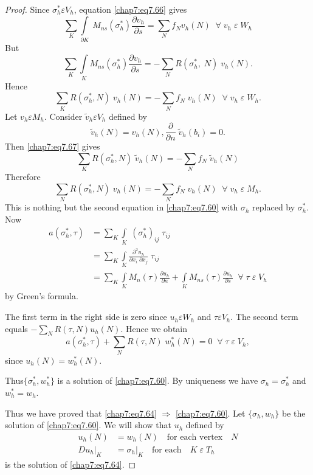 \begin{proof}
Since $\sigma_h^* \varepsilon V_h$, equation \eqref{chap7:eq7.66}
gives 
$$
\sum\limits_K\int\limits_{\partial K}\;M_{ns}(\sigma_h^*)
\frac{\partial v_h}{\partial s}=\sum\limits_Nf_Nv_h(N)\; \; \forall \;v_h
\;\varepsilon \;W_h
$$
But 
$$
\sum\limits_K\int\limits_KM_{ns}(\sigma_h^*)\frac{\partial v_h}
{\partial s}=-\sum\limits_NR(\sigma_h^*,\;N)\;v_h(N).
$$
Hence\pageoriginale
\begin{equation}\label{chap7:eq7.67}
\sum\limits_KR(\sigma_h^*,N)\;v_h(N)=-\sum\limits_Nf_N\;v_h(N)\; \; \forall
\;v_h \;\varepsilon \;W_h.
\end{equation}
Let $v_h\varepsilon M_h$. Consider $\tilde{v}_h\varepsilon V_h$
defined by 
$$
\tilde{v}_h(N)=v_h(N),\frac{\partial}{\partial n}\;\tilde{v}_h
(b_i)=0.
$$
Then \eqref{chap7:eq7.67} gives
$$
\sum\limits_KR(\sigma_h^*,N)\;\tilde{v}_h(N)=-\sum\limits_Nf_N
\;\tilde{v}_h(N) 
$$
Therefore 
$$
\sum\limits_NR(\sigma_h^*,N)\;v_h(N)=-\sum\limits_Nf_N\;v_h(N)\; \; \forall
\;v_h \;\varepsilon \;M_h.
$$
This is nothing but the second equation in \eqref{chap7:eq7.60} with
$\sigma_h$ replaced by $\sigma_h^*$. Now
\begin{align*}
a(\sigma_h^*,\tau) &= \sum\limits_K\int\limits_K\;(\sigma_h^*)_{ij}\;
\tau_{ij}\\ 
&= \sum\limits_K\int\limits_K\frac{\partial^2u_h}{\partial x_i\;
\partial x_j}\;\tau_{ij}\\
&= \sum\limits_K\int\limits_KM_n(\tau)\frac{\partial u_h}{\partial n}
+\int\limits_KM_{ns}(\tau)\frac{\partial u_h}{\partial s} \; \; \forall
\;\tau \;\varepsilon \;V_h
\end{align*}
by Green's formula.

The first term in the right side is zero since $u_h\varepsilon W_h$
and $\tau\varepsilon V_h$. The second term equals
$-\sum\limits_NR(\tau,N)u_h(N)$. Hence we obtain 
$$
a(\sigma_h^*,\tau)+\sum\limits_NR(\tau,N)\;w_h^*(N)=0\; \; \forall \;\tau
\;\varepsilon \;V_h,
$$
since $u_h(N)=w_h^*(N)$. 

Thus\pageoriginale $\{\sigma_h^*,w_h^*\}$ is a solution of
\eqref{chap7:eq7.60}. By uniqueness we have $\sigma_h=\sigma_h^*$ and
$w_h^*=w_h$. 

Thus we have proved that \eqref{chap7:eq7.64} $\Rightarrow$
\eqref{chap7:eq7.60}. Let $\{\sigma_h,w_h\}$ be the solution of
\eqref{chap7:eq7.60}. We will show that $u_h$ defined by 
\begin{align}
u_h(N) &= w_h(N)\quad\text{for each vertex}\quad
N \label{chap7:eq7.68}\\
Du_h|_K &= \sigma_h|_K\quad\text{for each}\quad K\;\varepsilon
\;T_h \label{chap7:eq7.69} 
\end{align}
is the solution of \eqref{chap7:eq7.64}.


\end{proof}
